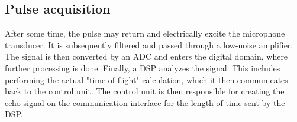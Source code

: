 \subsection{Pulse acquisition}
After some time, the pulse may return and electrically excite the microphone transducer. It is subsequently filtered and passed through a low-noise amplifier.
The signal is then converted by an ADC and enters the digital domain, where further processing is done. Finally, a DSP analyzes the signal. This includes performing the actual
"time-of-flight" calculation, which it then communicates back to the control unit. The control unit is then responsible for creating the echo signal on the communication interface
for the length of time sent by the DSP.
